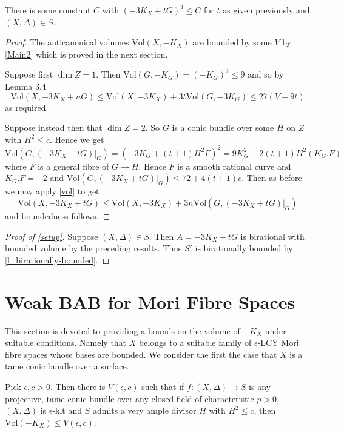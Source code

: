 \documentclass[a4paper,12pt]{book}
\newcommand{\Vol}{\text{Vol}}
\begin{document}
\begin{lemma}
	There is some constant $C$ with $(-3K_{X}+tG)^{3} \leq C$ for $t$ as given previously and $(X,\Delta)\in S$.
\end{lemma}

\begin{proof}
	The anticanonical volumes $\Vol(X,-K_{X})$ are bounded by some $V$ by \autoref{Main2} which is proved in the next section.
	
	Suppose first $\dim Z=1$. Then $\Vol(G,-K_{G})=(-K_{G})^{2} \leq 9$ and so by Lemma 3.4
	\[\Vol(X,-3K_{X}+nG) \leq \Vol(X,-3K_{X}) + 3t\Vol(G,-3K_{G})\leq 27(V+9t)\]
	as required.
	
	Suppose instead then that $\dim Z=2$. So $G$ is a conic bundle over some $H$ on $Z$ with $H^{2} \leq c$. Hence we get
	\[\Vol(G,(-3K_{X}+tG)|_{G})= (-3K_{G}+(t+1)H^{2}F)^{2}=9K_{G}^{2}-2(t+1)H^{2}(K_{G}.F)\]
	where $F$ is a general fibre of $G \to H$. Hence $F$ is a smooth rational curve and $K_{G}.F=-2$ and $\Vol(G,(-3K_{X}+tG)|_{G})\leq 72+4(t+1)c$. Then as before we may apply \autoref{vol} to get 
	\[\Vol(X,-3K_{X}+tG) \leq \Vol(X,-3K_{X}) + 3n\Vol(G,(-3K_{X}+tG)|_{G})\]
	and boundedness follows.
\end{proof}

\begin{proof}[Proof of \autoref{setup}]
	Suppose $(X,\Delta) \in S$. Then $A=-3K_{X}+tG$ is birational with bounded volume by the preceding results. Thus $S'$ is birationally bounded by \autoref{l_birationally-bounded}.
\end{proof}

\section{Weak BAB for Mori Fibre Spaces}
This section is devoted to providing a bounds on the volume of $-K_{X}$ under suitable conditions. Namely that $X$ belongs to a suitable family of $\epsilon$-LCY Mori fibre spaces whose bases are bounded. We consider the first the case that $X$ is a tame conic bundle over a surface.

\begin{theorem}\label{J1}
	Pick $\epsilon,c >0$. Then there is $V(\epsilon,c)$ such that if $f\colon (X,\Delta) \to S$ is any projective, tame conic bundle over any closed field of characteristic $p> 0$, $(X,\Delta)$ is $\epsilon$-klt and $S$ admits a very ample divisor $H$ with $H^{2} \leq c$, then $\Vol(-K_{X}) \leq V(\epsilon,c)$. 
\end{theorem}
\end{document}
